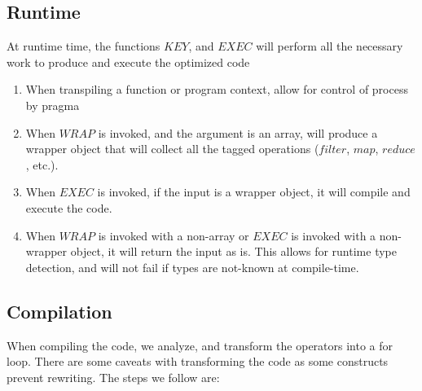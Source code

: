 \subsection{Runtime}
  At runtime time, the functions $KEY$, and $EXEC$ will perform all the necessary work to produce 
  and execute the optimized code
  \begin{enumerate}
    \item When transpiling a function or program context, allow for control of process by pragma
    \item When $WRAP$ is invoked, and the argument is an array, will produce a wrapper object that will collect 
      all the tagged operations ($filter$, $map$, $reduce$, etc.).  
    \item When $EXEC$ is invoked, if the input is a wrapper object, it will compile and execute the code.      
    \item When $WRAP$ is invoked with a non-array or $EXEC$ is invoked with a non-wrapper object, 
      it will return the input as is.  This allows for runtime type detection, and will not fail if 
      types are not-known at compile-time.          
  \end{enumerate}

\subsection{Compilation}
  When compiling the code, we analyze, and transform the operators into a for loop.  There are some
  caveats with transforming the code as some constructs prevent rewriting. The steps we follow are:

